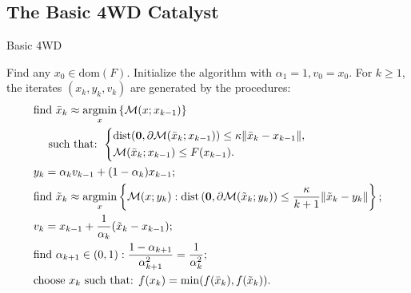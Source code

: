 \documentclass[11pt]{beamer}
\begin{document}
    \subsection{The Basic 4WD Catalyst}
        \begin{frame}{Basic 4WD}
            \begin{definition}
            {\small
                Find any $x_0 \in \text{dom}(F)$. 
                Initialize the algorithm with $\alpha_1 = 1, v_0 = x_0$. 
                For $k \ge 1$, the iterates $(x_k, y_k, v_k)$ are generated by the procedures: 
                \vspace{-0.5em}
                \begin{align*}
                    &
                    \text{find } \bar x_k \approx \mathop{\rm argmin}\limits_{x}\left\lbrace
                        \mathcal M(x; x_{k - 1})
                    \right\rbrace
                    \\ &\quad 
                    \text{ such that:  }
                        \left\lbrace
                            \begin{aligned}
                                & \text{dist}(\mathbf 0, \partial \mathcal M(\bar x_k; x_{k - 1})) 
                                \le 
                                \kappa\Vert \bar x_k - x_{k - 1}\Vert, 
                                \\
                                & \mathcal M(\bar x_k; x_{k - 1}) 
                                \le F(x_{k - 1}). 
                            \end{aligned}
                        \right.
                    \\
                    & y_k = \alpha_k v_{k - 1} + (1 - \alpha_k) x_{k - 1};
                    \\
                    & 
                    \text{find }\tilde x_k \approx \mathop{\rm argmin}\limits_{x} \left\lbrace
                        \mathcal M(x; y_k) 
                        : 
                        \text{dist}\left(
                        \mathbf 0, \partial \mathcal M(\tilde x_k; y_k)
                        \right) 
                        \le \frac{\kappa}{k + 1}\Vert \tilde x_k - y_k\Vert
                    \right\rbrace;
                    \\
                    & v_{k} = x_{k - 1} + \frac{1}{\alpha_k}(\tilde x_k - x_{k - 1});
                    \\
                    & 
                    \text{find } \alpha_{k + 1} \in (0, 1): 
                    \frac{1 - \alpha_{k + 1}}{\alpha_{k + 1}^2} = \frac{1}{\alpha_k^2};
                    \\
                    & \text{choose } x_k \text{ such that:  } f(x_k) = \min(f(\bar x_k), f(\tilde x_k)). 
                \end{align*}
            }
            \end{definition}
        \end{frame}
\end{document}
